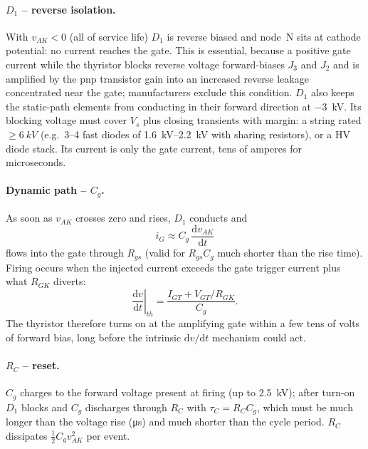 \documentclass[11pt,a4paper]{article}
\begin{document}
\paragraph{$D_1$ -- reverse isolation.} With $v_{AK} < 0$ (all of service life) $D_1$ is reverse
biased and node~N sits at cathode potential: no current reaches the gate. This is essential,
because a positive gate current while the thyristor blocks reverse voltage forward-biases $J_3$
and $J_2$ and is amplified by the pnp transistor gain into an increased reverse leakage
concentrated near the gate; manufacturers exclude this condition. $D_1$ also keeps the
static-path elements from conducting in their forward direction at \SI{-3}{kV}. Its blocking
voltage must cover $V_s$ plus closing transients with margin: a string rated $\ge \SI{6}{kV}$
(e.g.\ 3--4 fast diodes of \SIrange{1.6}{2.2}{kV} with sharing resistors), or a HV diode stack.
Its current is only the gate current, tens of amperes for microseconds.

\paragraph{Dynamic path -- $C_g$.} As soon as $v_{AK}$ crosses zero and rises, $D_1$ conducts and
\begin{equation}
  i_G \approx C_g\,\frac{\mathrm{d}v_{AK}}{\mathrm{d}t}
\end{equation}
flows into the gate through $R_{gs}$ (valid for $R_{gs}C_g$ much shorter than the rise time).
Firing occurs when the injected current exceeds the gate trigger current plus what $R_{GK}$
diverts:
\begin{equation}
  \left.\frac{\mathrm{d}v}{\mathrm{d}t}\right|_{th} = \frac{I_{GT} + V_{GT}/R_{GK}}{C_g}.
  \label{eq:dvth}
\end{equation}
The thyristor therefore turns on at the amplifying gate within a few tens of volts of forward
bias, long before the intrinsic $\mathrm{d}v/\mathrm{d}t$ mechanism could act.

\paragraph{$R_C$ -- reset.} $C_g$ charges to the forward voltage present at firing (up to
\SI{2.5}{kV}); after turn-on $D_1$ blocks and $C_g$ discharges through $R_C$ with
$\tau_{C} = R_C C_g$, which must be much longer than the voltage rise (\si{\micro s}) and much
shorter than the cycle period. $R_C$ dissipates $\tfrac12 C_g v_{AK}^2$ per event.
\end{document}
